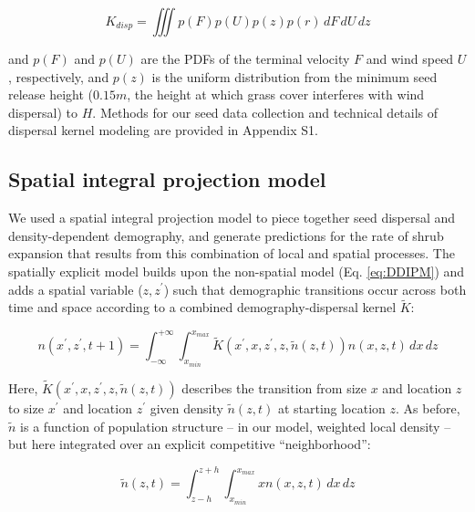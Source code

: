 \documentclass[11pt]{article}\usepackage[]{graphicx}\usepackage[usenames,dvipsnames]{xcolor}
\begin{document}
\begin{linenomath*} \label{eq:Kd}
\begin{equation} K_{disp} = \iiint p(F)p(U)p(z)p(r) \,dF\,dU\,dz \end{equation} 
\end{linenomath*} 

and $p(F)$ and $p(U)$ are the PDFs of the terminal velocity $F$ and wind speed $U$, respectively, and $p(z)$ is the uniform distribution from the minimum seed release height ($0.15m$, the height at which grass cover interferes with wind dispersal) to $H$.
Methods for our seed data collection and technical details of dispersal kernel modeling are provided in Appendix S1. 

\subsection*{Spatial integral projection model}

We used a spatial integral projection model to piece together seed dispersal and density-dependent demography, and generate predictions for the rate of shrub expansion that results from this combination of local and spatial processes. 
The spatially explicit model builds upon the non-spatial model (Eq. \ref{eq:DDIPM}) and adds a spatial variable ($z,z^\prime$) such that demographic transitions occur across both time and space according to a combined demography-dispersal kernel $\tilde{K}$:

\begin{linenomath*} 
\begin{equation} \label{eq:SIPM}
n(x^\prime,z^\prime,t + 1) = \int_{-\infty}^{+\infty} \int_{x_{min}}^{x_{max}} \tilde{K}(x^\prime,x,z^\prime,z,\tilde{n}(z,t)) n(x,z,t) \,dx \,dz 
\end{equation} 
\end{linenomath*}

Here, $\tilde{K}(x^\prime,x,z^\prime,z,\tilde{n}(z,t))$ describes the transition from size $x$ and location $z$ to size $x^\prime$ and location $z^\prime$ given density $\tilde{n}(z,t)$ at starting location $z$.
As before, $\tilde{n}$ is a function of population structure -- in our model, weighted local density -- but here integrated over an explicit competitive ``neighborhood'': 

\begin{linenomath*} 
\begin{equation} \label{eq:neighborhood}
\tilde{n}(z,t)=\int_{z-h}^{z+h} \int_{x_{min}}^{x_{max}} x n(x,z,t) \,dx \,dz
\end{equation} 
\end{linenomath*}
\end{document}

